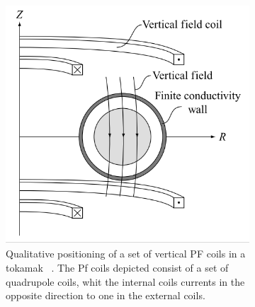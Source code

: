   \begin{figure}
  	\centering
  	\begin{subfigure}[b]{0.39\textwidth}
  		\includegraphics[width=\textwidth]{Chp1/PFcoils.png}
  		\caption{ Qualitative positioning of a set of vertical PF coils in a tokamak ~\cite[Chapter~11]{Freidberg2007}. The Pf coils depicted consist of a set of quadrupole coils, whit the internal coils currents in the opposite direction to one in the external coils. \label{} }
  	\end{subfigure}
  	~~
  	\begin{subfigure}[b]{0.39\textwidth}

\end{subfigure}
\end{figure}

